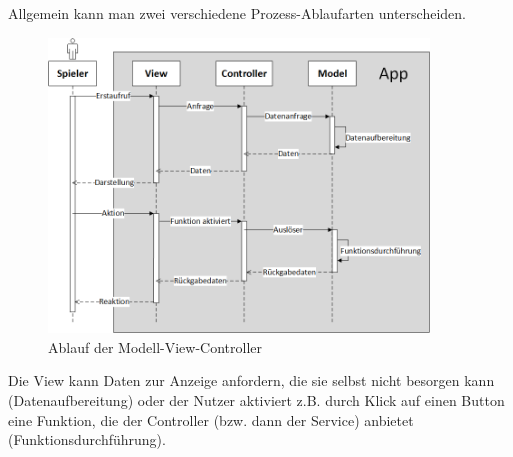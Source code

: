 Allgemein kann man zwei verschiedene Prozess-Ablaufarten unterscheiden. 
\begin{figure}[h]
\centering
\includegraphics[width=0.9\textwidth]{ref/images/mvc-ablauf.png}
\caption[Ablauf der Modell-View-Controller]{Ablauf der Modell-View-Controller}
\label{fig:MVC-Ablauf}
\end{figure} 

Die View kann Daten zur Anzeige anfordern, die sie selbst nicht besorgen kann (Datenaufbereitung) oder der Nutzer aktiviert z.B. durch Klick auf einen Button eine Funktion, die der Controller (bzw. dann der Service) anbietet (Funktionsdurchführung).